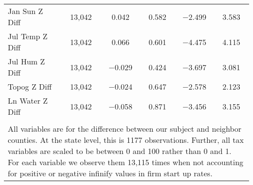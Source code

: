 \begin{table}[!htbp]
\begin{tabular}{@{\extracolsep{5pt}}lccccc}
Jan Sun Z Diff & 13,042 & 0.042 & 0.582 & $-$2.499 & 3.583 \\ 
Jul Temp Z Diff & 13,042 & 0.066 & 0.601 & $-$4.475 & 4.115 \\ 
Jul Hum Z Diff & 13,042 & $-$0.029 & 0.424 & $-$3.697 & 3.081 \\ 
Topog Z Diff & 13,042 & $-$0.024 & 0.647 & $-$2.578 & 2.123 \\ 
Ln Water Z Diff & 13,042 & $-$0.058 & 0.871 & $-$3.456 & 3.155 \\ 
\hline \\[-1.8ex] 
\multicolumn{6}{l}{All variables are for the difference between our subject and neighbor counties. At the state level, this is 1177 observations. Further, all tax variables are scaled to be between 0 and 100 rather than 0 and 1. For each variable we observe them 13,115 times when not accounting for positive or negative infinify values in firm start up rates.} \\ 
\end{tabular} 
\end{table} 
